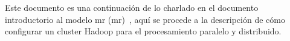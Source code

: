 Este documento es una continuación de lo charlado en el documento introductorio
al modelo \acrlong{mr} (\acrshort{mr})~\cite{ramirez2021}, aquí se procede a la
descripción de cómo configurar un cluster Hadoop para el procesamiento paralelo
y distribuido.

